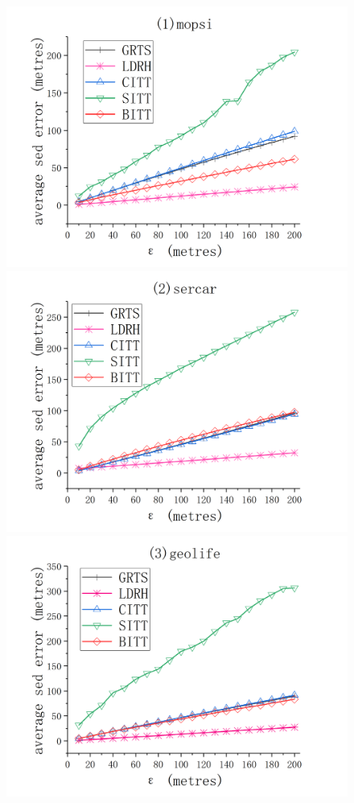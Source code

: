 {\begin{figure}[tb!]
	\centering
	\includegraphics[scale = 0.560]{figures/Fig-mopsi-sed-error.png}\hspace{1ex}
	\includegraphics[scale = 0.560]{figures/Fig-sercar-sed-error.png}\hspace{1ex}
	\includegraphics[scale = 0.560]{figures/Fig-geolife-sed-error.png}\hspace{1ex}

\end{figure}}
